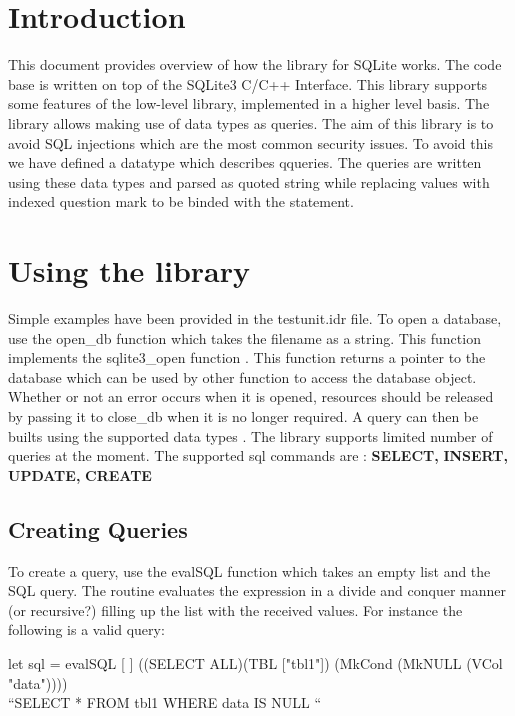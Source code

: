 \documentclass[11pt]{article}
\begin{document}
         
 \section{Introduction}
\label{Introduction} 
This document provides overview of how the library for SQLite works. The code base is written on top of the SQLite3 C/C++ Interface. This library supports some features of the low-level library, implemented in a higher level basis.
The library allows making use of data types as queries. The aim of this library is to avoid SQL injections which are the most common security issues. To avoid this we have defined a datatype which describes qqueries. The queries are written using these data types and parsed as quoted string while replacing values with indexed question mark to be binded with the statement.
\section{Using the library}
\label{Using the library}
Simple examples have been provided in the testunit.idr file.
To open a database, use the open\_db function which takes the filename as a string.  This function implements the sqlite3\_open function . This function returns a pointer to the database which can be used by other function to access the database object.
Whether or not an error occurs when it is opened, resources should be released by passing it to close\_db when it is no longer required.
A query can then be builts using the supported data types . The library supports limited number of queries at the moment. The supported sql commands are :
\newline
\newline
\textbf{SELECT,}
\textbf{INSERT,}
\textbf{UPDATE,}
\textbf{CREATE}

\subsection{Creating Queries}
\label{Creating Queries}

To create a query, use the evalSQL function which takes an empty list and the SQL query. The routine evaluates the expression in a divide and conquer manner (or recursive?)
filling up the list with the received values. For instance the following is a valid query:

let sql = evalSQL [ ] ((SELECT ALL)(TBL ["tbl1"]) (MkCond (MkNULL (VCol "data"))))
\newline
{}
\\“SELECT * FROM tbl1 WHERE data IS NULL “
\end{document}
